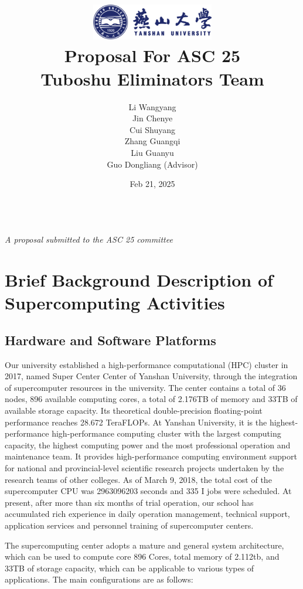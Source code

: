 \documentclass[a4paper,12pt]{article}
\title{
    \includegraphics[width=0.4\textwidth]{images/logo/ysu-logo.png}\\[2cm] %
    {\LARGE \textbf {Proposal For ASC 25}}\\[0.5cm]
    \large Tuboshu Eliminators Team\\[1cm] %
}
\author{
    \begin{tabular}{c}
        \large Li Wangyang \\[0.15cm]
        \large Jin Chenye \\[0.15cm]
        \large Cui Shuyang \\[0.15cm]
        \large Zhang Guangqi \\[0.15cm]
        \large Liu Guanyu \\[0.15cm]
        \large Guo Dongliang (Advisor)
    \end{tabular}
}
\date{}
\begin{document}
\maketitle
\thispagestyle{empty}
\vfill
\begin{center}
    \date {\large {Feb 21, 2025}} \\[1cm]
    \textit{A proposal submitted to the ASC 25 committee}
\end{center}
\newpage

\tableofcontents
{}
\newpage

\section{Brief Background Description of Supercomputing Activities}

\subsection{Hardware and Software Platforms}

Our university established a high-performance computational (HPC) cluster in 2017, named Super Center Center of Yanshan University, through the integration of supercomputer resources in the university. The center contains a total of 36 nodes, 896 available computing cores, a total of 2.176TB of memory and 33TB of available storage capacity. Its theoretical double-precision floating-point performance reaches 28.672 TeraFLOPs. At Yanshan University, it is the highest-performance high-performance computing cluster with the largest computing capacity, the highest computing power and the most professional operation and maintenance team. It provides high-performance computing environment support for national and provincial-level scientific research projects undertaken by the research teams of other colleges. As of March 9, 2018, the total cost of the supercomputer CPU was 2963096203 seconds and 335 I jobs were scheduled. At present, after more than six months of trial operation, our school has accumulated rich experience in daily operation management, technical support, application services and personnel training of supercomputer centers.

The supercomputing center adopts a mature and general system architecture, which can be used to compute core 896 Cores, total memory of 2.112tb, and 33TB of storage capacity, which can be applicable to various types of applications. The main configurations are as follows:
\end{document}
